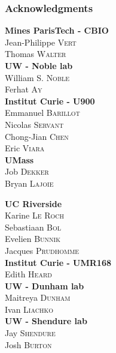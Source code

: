\documentclass[xcolor=dvipsnames]{beamer}
\begin{document}
\begin{frame}
\frametitle{Acknowledgments}
\fboxsep=0pt
\noindent
\begin{minipage}[t]{0.48\linewidth}
\textbf{Mines ParisTech - CBIO} \\
Jean-Philippe \textsc{Vert} \\
Thomas \textsc{Walter} \\

\textbf{UW - Noble lab} \\
William S. \textsc{Noble} \\
Ferhat \textsc{Ay} \\

\textbf{Institut Curie - U900} \\
Emmanuel \textsc{Barillot} \\
Nicolas \textsc{Servant} \\
Chong-Jian \textsc{Chen} \\
Eric \textsc{Viara} \\

\textbf{UMass} \\
Job \textsc{Dekker} \\
Bryan \textsc{Lajoie} \\

\end{minipage}
\hfill%
\begin{minipage}[t]{0.48\linewidth}

\textbf{UC Riverside} \\
Karine \textsc{Le Roch} \\
Sebastiaan \textsc{Bol} \\
Evelien \textsc{Bunnik} \\
Jacques \textsc{Prudhomme} \\

\textbf{Institut Curie - UMR168} \\
Edith \textsc{Heard} \\

\textbf{UW - Dunham lab} \\
Maitreya \textsc{Dunham} \\
Ivan \textsc{Liachko} \\

\textbf{UW - Shendure lab} \\
Jay \textsc{Shendure} \\
Josh \textsc{Burton} \\

\end{minipage}

\end{frame}
\end{document}
